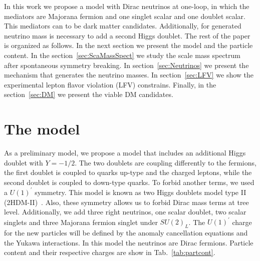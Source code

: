 \documentclass[12pt]{article}
\begin{document}
In this work we propose a model with Dirac neutrinos at one-loop, in which the mediators are Majorana fermion and one singlet scalar and one doublet scalar. This mediators can to be dark matter candidates. Additionally, for generated neutrino mass is necessary to add a second Higgs doublet. The rest of the paper is organized as follows. In the next section we present the model and the particle content. In the section~\ref{sec:ScaMassSpect} we study the scale mass spectrum after spontaneous symmetry breaking. In section~\ref{sec:Neutrinos} we present the mechanism that generates the neutrino masses. In section~\ref{sec:LFV} we show the experimental lepton flavor violation (LFV) constrains. Finally, in the section~\ref{sec:DM} we present the viable DM candidates.

\section{The model}
\label{sec:Model}
As a preliminary model, we propose a model that includes an additional Higgs doublet with $ Y = -1/2 $. The two doublets are coupling differently to the fermions, the first doublet is coupled to quarks up-type and the charged leptons, while the second doublet is coupled to down-type quarks. To forbid another terms, we used a $U(1)^{\prime}$ symmetry. This model is known as two Higgs doublets model type II (2HDM-II)~\cite{Davidson:2005cw}. Also, these symmetry allows us to forbid Dirac mass terms at tree level. Additionally, we add three right neutrinos, one scalar doublet, two scalar singlets and three Majorana fermion singlet under $SU(2)_L$. The $U(1)^{\prime}$ charge for the new particles will be defined by the anomaly cancellation equations and the Yukawa interactions. In this model the neutrinos are Dirac fermions. Particle content and their respective charges are show in Tab.~\ref{tab:partcont}. 
\end{document}
